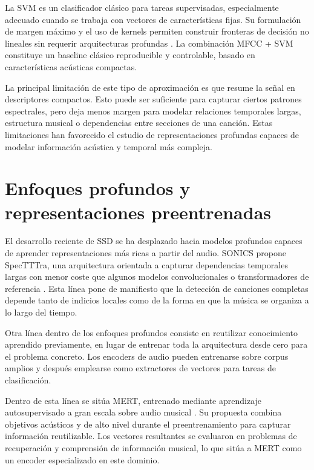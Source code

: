 La SVM es un clasificador clásico para tareas supervisadas, especialmente adecuado cuando se trabaja con vectores de características fijas. Su formulación de margen máximo y el uso de kernels permiten construir fronteras de decisión no lineales sin requerir arquitecturas profundas \cite{cortes1995support}. La combinación MFCC + SVM constituye un baseline clásico reproducible y controlable, basado en características acústicas compactas.

La principal limitación de este tipo de aproximación es que resume la señal en descriptores compactos. Esto puede ser suficiente para capturar ciertos patrones espectrales, pero deja menos margen para modelar relaciones temporales largas, estructura musical o dependencias entre secciones de una canción. Estas limitaciones han favorecido el estudio de representaciones profundas capaces de modelar información acústica y temporal más compleja.

\section{Enfoques profundos y representaciones preentrenadas}

El desarrollo reciente de SSD se ha desplazado hacia modelos profundos capaces de aprender representaciones más ricas a partir del audio. SONICS propone SpecTTTra, una arquitectura orientada a capturar dependencias temporales largas con menor coste que algunos modelos convolucionales o transformadores de referencia \cite{rahman2024sonics}. Esta línea pone de manifiesto que la detección de canciones completas depende tanto de indicios locales como de la forma en que la música se organiza a lo largo del tiempo.

Otra línea dentro de los enfoques profundos consiste en reutilizar conocimiento aprendido previamente, en lugar de entrenar toda la arquitectura desde cero para el problema concreto. Los encoders de audio pueden entrenarse sobre corpus amplios y después emplearse como extractores de vectores para tareas de clasificación.

Dentro de esta línea se sitúa MERT, entrenado mediante aprendizaje autosupervisado a gran escala sobre audio musical \cite{li2024mert}. Su propuesta combina objetivos acústicos y de alto nivel durante el preentrenamiento para capturar información reutilizable. Los vectores resultantes se evaluaron en problemas de recuperación y comprensión de información musical, lo que sitúa a MERT como un encoder especializado en este dominio.

